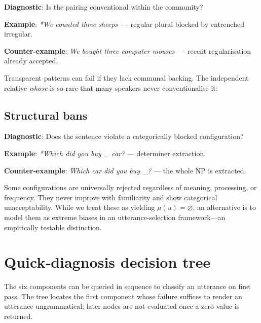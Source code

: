 \documentclass[12pt]{article}
\begin{document}
\begin{tcolorbox}[colback=lsLightBlue!30]
\textbf{Diagnostic}: Is the pairing conventional within the community?

\textbf{Example}: \textit{*We counted three sheeps}~— regular plural blocked by entrenched irregular.

\textbf{Counter‑example}: \textit{We bought three computer mouses}~— recent regularisation already accepted.
\end{tcolorbox}

Transparent patterns can fail if they lack communal backing.  The independent relative \textit{whose} is so rare that many speakers never conventionalise it:
\z

\subsection{Structural bans}

\begin{tcolorbox}[colback=lsLightBlue!30]
\textbf{Diagnostic}: Does the sentence violate a categorically blocked configuration?

\textbf{Example}: \textit{*\hspace{0.2ex}Which\hspace{0.2ex} did you buy \_ car?} — determiner extraction.

\textbf{Counter‑example}: \textit{Which car did you buy \_?} — the whole NP is extracted.
\end{tcolorbox}

Some configurations are universally rejected regardless of meaning, processing, or frequency.  They never improve with familiarity and show categorical unacceptability. While we treat these as yielding $\mu(u)=\varnothing$, an alternative is to model them as extreme biases in an utterance-selection framework—an empirically testable distinction.


\section{Quick‑diagnosis decision tree}

The six components can be queried in sequence to classify an utterance on first pass. The tree locates the first component whose failure suffices to render an utterance ungrammatical; later nodes are not evaluated once a zero value is returned.
\end{document}
